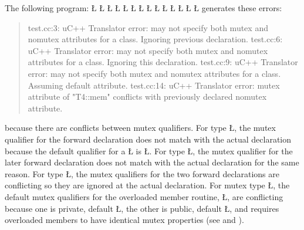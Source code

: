 \documentclass[openright,twoside]{report}
\begin{document}
The following program:
\LGinlinefalse\LGbegin\lgrinde
\L{}
\L{}
\CE{}\L{\LB{}}
\L{}
\L{}
\CE{}\L{\LB{}}
\L{}
\CE{}\L{}
\CE{}\L{\LB{}}
\L{}
\L{\LB{}}
\CE{}\L{}
\L{\LB{}}
\CE{}\L{\LB{\};}}
\endlgrinde\LGend
generates these errors:
\begin{quote}
\BGfont
test.cc:3: uC++ Translator error: may not specify both mutex and nomutex attributes for a class. Ignoring previous declaration.
\newline
test.cc:6: uC++ Translator error: may not specify both mutex and nomutex attributes for a class. Ignoring this declaration.
\newline
test.cc:9: uC++ Translator error: may not specify both mutex and nomutex attributes for a class. Assuming default attribute.
\newline
test.cc:14: uC++ Translator error: mutex attribute of "T4::mem" conflicts with previously declared nomutex attribute.
\end{quote}
because there are conflicts between mutex qualifiers.
For type \LGinlinetrue\LGbegin\lgrinde\L{}\endlgrinde\LGend{}, the mutex qualifier for the forward declaration does not match with the actual declaration because the default qualifier for a \LGinlinetrue\LGbegin\lgrinde\L{}\endlgrinde\LGend{} is \LGinlinetrue\LGbegin\lgrinde\L{}\endlgrinde\LGend{}.
For type \LGinlinetrue\LGbegin\lgrinde\L{}\endlgrinde\LGend{}, the mutex qualifier for the later forward declaration does not match with the actual declaration for the same reason.
For type \LGinlinetrue\LGbegin\lgrinde\L{}\endlgrinde\LGend{}, the mutex qualifiers for the two forward declarations are conflicting so they are ignored at the actual declaration.
For mutex type \LGinlinetrue\LGbegin\lgrinde\L{}\endlgrinde\LGend{}, the default mutex qualifiers for the overloaded member routine, \LGinlinetrue\LGbegin\lgrinde\L{}\endlgrinde\LGend{}, are conflicting because one is private, default \LGinlinetrue\LGbegin\lgrinde\L{}\endlgrinde\LGend{}, the other is public, default \LGinlinetrue\LGbegin\lgrinde\L{}\endlgrinde\LGend{}, and \uC requires overloaded members to have identical mutex properties (see  and ).
\end{document}
